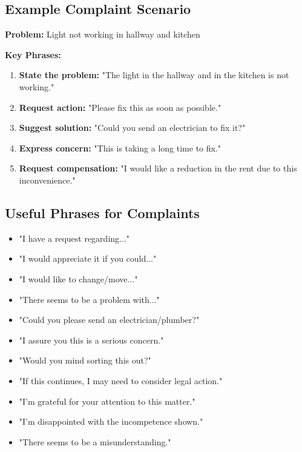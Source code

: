 \subsection{Example Complaint Scenario}

\begin{tcolorbox}[colback=red!5, colframe=red!30, title=Sample Complaint Letter Structure]
\textbf{Problem:} Light not working in hallway and kitchen

\textbf{Key Phrases:}
\begin{enumerate}
    \item \textbf{State the problem:} "The light in the hallway and in the kitchen is not working."
    \item \textbf{Request action:} "Please fix this as soon as possible."
    \item \textbf{Suggest solution:} "Could you send an electrician to fix it?"
    \item \textbf{Express concern:} "This is taking a long time to fix."
    \item \textbf{Request compensation:} "I would like a reduction in the rent due to this inconvenience."
\end{enumerate}
\end{tcolorbox}

\subsection{Useful Phrases for Complaints}
\begin{itemize}
    \item "I have a request regarding..."
    \item "I would appreciate it if you could..."
    \item "I would like to change/move..."
    \item "There seems to be a problem with..."
    \item "Could you please send an electrician/plumber?"
    \item "I assure you this is a serious concern."
    \item "Would you mind sorting this out?"
    \item "If this continues, I may need to consider legal action."
    \item "I'm grateful for your attention to this matter."
    \item "I'm disappointed with the incompetence shown."
    \item "There seems to be a misunderstanding."
\end{itemize}

